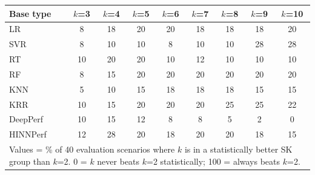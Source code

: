 \begin{tabular}{lcccccccc}
\toprule
Base type & $k$=3 & $k$=4 & $k$=5 & $k$=6 & $k$=7 & $k$=8 & $k$=9 & $k$=10 \\
\midrule
LR & 8 & 18 & 20 & 20 & 18 & 18 & 18 & 20 \\
SVR & 8 & 10 & 10 & 8 & 10 & 10 & 28 & 28 \\
RT & 10 & 20 & 20 & 10 & 12 & 10 & 10 & 10 \\
RF & 8 & 15 & 20 & 20 & 20 & 20 & 20 & 20 \\
KNN & 5 & 10 & 15 & 18 & 18 & 18 & 15 & 15 \\
KRR & 10 & 15 & 20 & 20 & 20 & 25 & 25 & 22 \\
DeepPerf & 10 & 15 & 12 & 8 & 8 & 5 & 2 & 0 \\
HINNPerf & 12 & 28 & 20 & 18 & 20 & 20 & 18 & 15 \\
\bottomrule
\multicolumn{9}{l}{\footnotesize Values = \% of 40 evaluation scenarios where $k$ is in a statistically better SK group than $k$=2. 0 = $k$ never beats $k$=2 statistically; 100 = always beats $k$=2.}} \\
\end{tabular}
